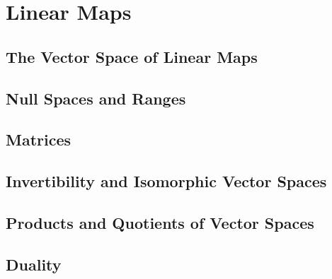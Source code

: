 \chapter{Linear Maps}

\section{The Vector Space of Linear Maps}

\section{Null Spaces and Ranges}

\section{Matrices}

\section{Invertibility and Isomorphic Vector Spaces}

\section{Products and Quotients of Vector Spaces}

\section{Duality}
